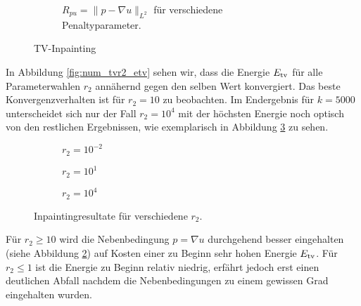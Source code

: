\documentclass{mythesis}
\begin{document}
\begin{figure}[ht]
\begin{subfigure}{0.6\textwidth}
	\caption{$R_{pu} = \|p - \nabla u\|_{L^2}$ für verschiedene Penaltyparameter.}
	\label{fig:num_tvr2_pu}
    \end{subfigure}
    \caption{TV-Inpainting}
\end{figure}

In Abbildung \ref{fig:num_tvr2_etv} sehen wir, dass die Energie $E_{\mathrm{tv}}$ für alle Parameterwahlen $r_2$ annähernd gegen den selben Wert konvergiert.
Das beste Konvergenzverhalten ist für $r_2 = 10$ zu beobachten.
Im Endergebnis für $k = 5000$ unterscheidet sich nur der Fall $r_2 = 10^4$ mit der höchsten Energie noch optisch von den restlichen Ergebnissen, wie exemplarisch in Abbildung \ref{fig:num_tvr2_png} zu sehen.

\begin{figure}[ht]
    \centering
    \begin{subfigure}{0.2\textwidth}
	\centering
	\caption{$r_2=10^{-2}$}
    \end{subfigure}%
    \begin{subfigure}{0.2\textwidth}
	\centering
	\caption{$r_2=10^{1}$}
    \end{subfigure}%
    \begin{subfigure}{0.2\textwidth}
	\centering
	\caption{$r_2=10^{4}$}
    \end{subfigure}%
    \caption{Inpaintingresultate für verschiedene $r_2$.}
    \label{fig:num_tvr2_png}
\end{figure}

Für $r_2 \ge 10$ wird die Nebenbedingung $p = \nabla u$ durchgehend besser eingehalten (siehe Abbildung \ref{fig:num_tvr2_pu}) auf Kosten einer zu Beginn sehr hohen Energie $E_{\mathrm{tv}}$.
Für $r_2 \le 1$ ist die Energie zu Beginn relativ niedrig, erfährt jedoch erst einen deutlichen Abfall nachdem die Nebenbedingungen zu einem gewissen Grad eingehalten wurden.
\end{document}
